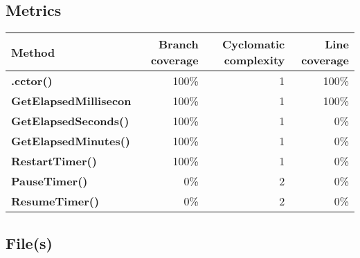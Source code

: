 \documentclass[a4paper,landscape,10pt]{article}
\begin{document}
\subsection{Metrics}
\begin{longtable}[l]{|l|r|r|r|}
\hline
\textbf{Method} & \textbf{Branch coverage} & \textbf{Cyclomatic complexity} & \textbf{Line coverage}\\
\hline
\textbf{.cctor()} & 100\% & 1 & 100\%\\
\hline
\textbf{GetElapsedMillisecon} & 100\% & 1 & 100\%\\
\hline
\textbf{GetElapsedSeconds()} & 100\% & 1 & 0\%\\
\hline
\textbf{GetElapsedMinutes()} & 100\% & 1 & 0\%\\
\hline
\textbf{RestartTimer()} & 100\% & 1 & 0\%\\
\hline
\textbf{PauseTimer()} & 0\% & 2 & 0\%\\
\hline
\textbf{ResumeTimer()} & 0\% & 2 & 0\%\\
\hline
\end{longtable}
\subsection{File(s)}
\end{document}
